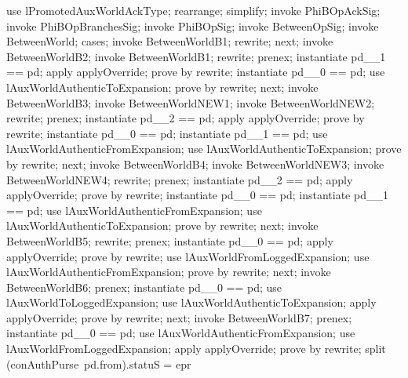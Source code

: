 \begin{LPScript}\begin{zproof}[lPromotedBetweenWorldAckType]
    use lPromotedAuxWorldAckType;
    rearrange;
    simplify;
    invoke PhiBOpAckSig;
    invoke PhiBOpBranchesSig;
    invoke PhiBOpSig;
    invoke BetweenOpSig;
    invoke BetweenWorld;
    cases;
        invoke BetweenWorldB1;
        rewrite;
    next;
        invoke BetweenWorldB2;
        invoke BetweenWorldB1;
        rewrite;
        prenex;
        instantiate pd\_\_1 == pd;
        apply applyOverride;
        prove by rewrite;
        instantiate pd\_\_0 == pd;
        use lAuxWorldAuthenticToExpansion;
        prove by rewrite;
    next;
        invoke BetweenWorldB3;
        invoke BetweenWorldNEW1;
        invoke BetweenWorldNEW2;
        rewrite;
        prenex;
        instantiate pd\_\_2 == pd;
        apply applyOverride;
        prove by rewrite;
        instantiate pd\_\_0 == pd;
        instantiate pd\_\_1 == pd;
        use lAuxWorldAuthenticFromExpansion;
        use lAuxWorldAuthenticToExpansion;
        prove by rewrite;
    next;
        invoke BetweenWorldB4;
        invoke BetweenWorldNEW3;
        invoke BetweenWorldNEW4;
        rewrite;
        prenex;
        instantiate pd\_\_2 == pd;
        apply applyOverride;
        prove by rewrite;
        instantiate pd\_\_0 == pd;
        instantiate pd\_\_1 == pd;
        use lAuxWorldAuthenticFromExpansion;
        use lAuxWorldAuthenticToExpansion;
        prove by rewrite;
    next;
        invoke BetweenWorldB5;
        rewrite;
        prenex;
        instantiate pd\_\_0 == pd;
        apply applyOverride;
        prove by rewrite;
        use lAuxWorldFromLoggedExpansion;
        use lAuxWorldAuthenticFromExpansion;
        prove by rewrite;
    next;
        invoke BetweenWorldB6;
        prenex;
        instantiate pd\_\_0 == pd;
        use lAuxWorldToLoggedExpansion;
        use lAuxWorldAuthenticToExpansion;
        apply applyOverride;
        prove by rewrite;
    next;
        invoke BetweenWorldB7;
        prenex;
        instantiate pd\_\_0 == pd;
        use lAuxWorldAuthenticFromExpansion;
        use lAuxWorldFromLoggedExpansion;
        apply applyOverride;
        prove by rewrite;
        split (conAuthPurse~pd.from).statuS = epr

\end{zproof}
\end{LPScript}
